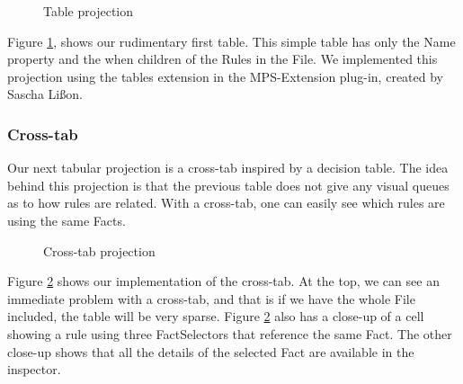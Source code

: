 \begin{figure}[h]
    \centering
    \caption{Table projection}
    \label{fig:tableProjection1}
\end{figure}
Figure \ref{fig:tableProjection1}, shows our rudimentary first table.
This simple table has only the Name property and the when children of the Rules in the File.
We implemented this projection using the tables extension in the MPS-Extension plug-in, created by Sascha Lißon.

\subsubsection{Cross-tab}
Our next tabular projection is a cross-tab inspired by a decision table.
The idea behind this projection is that the previous table does not give any visual queues as to how rules are related.
With a cross-tab, one can easily see which rules are using the same Facts.

\begin{figure}[h]
    \centering
    \caption{Cross-tab projection}
    \label{fig:crosstabProjection1}
\end{figure}

Figure \ref{fig:crosstabProjection1} shows our implementation of the cross-tab.
At the top, we can see an immediate problem with a cross-tab, and that is if we have the whole File included, the table will be very sparse.
Figure \ref{fig:crosstabProjection1} also has a close-up of a cell showing a rule using three FactSelectors that reference the same Fact.
The other close-up shows that all the details of the selected Fact are available in the inspector.

